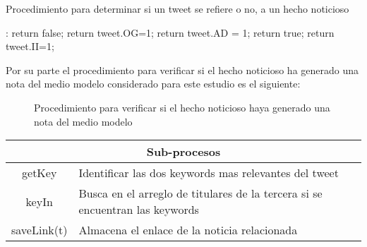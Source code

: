 \begin{algorithm}[H]
	\caption{Procedimiento para determinar si un tweet se refiere o no, a un hecho noticioso}
	\label{ifNoticia}
	\begin{algorithmic}[1]
		
		:
		\State return false;
		\Else
		\State return tweet.OG=1;
		\Else
		\State return tweet.AD = 1;
		\Else
		\State return true;
		\EndIf
		\Else
		\State return tweet.II=1;
		\EndIf
		\EndIf
		\EndIf
		\EndFunction
	\end{algorithmic}
\end{algorithm}	

Por su parte el procedimiento para verificar si el hecho noticioso ha generado una nota del medio modelo considerado para este estudio es el siguiente:

\begin{figure}[H]
\begin{center}
	\caption{Procedimiento para verificar si el hecho noticioso haya generado una nota del medio modelo}
	\label{fig:haveLink}
\end{center}
\end{figure}

\begin{center}
	\begin{tabular}{|c|l|}
		\hline
		\multicolumn{2}{|c|}{\textbf{Sub-procesos}} \\ \hline
		getKey & Identificar las dos keywords mas relevantes del tweet\\ \hline
		keyIn  & Busca en el arreglo de titulares de la tercera si se encuentran las keywords \\              \hline
		saveLink(t) & Almacena el enlace de la noticia relacionada \\ \hline
	\end{tabular}
\end{center}

